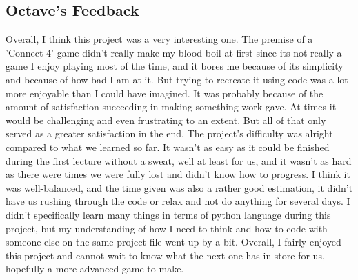 \documentclass{article}
\begin{document}
\subsection{Octave's Feedback}

Overall, I think this project was a very interesting one. The premise of a 'Connect 4' game didn't really make my blood boil at first since its not really a game I enjoy playing most of the time, and it bores me because of its simplicity and because of how bad I am at it. But trying to recreate it using code was a lot more enjoyable than I could have imagined. It was probably because of the amount of satisfaction succeeding in making something work gave. At times it would be challenging and even frustrating to an extent. But all of that only served as a greater satisfaction in the end. The project's difficulty was alright compared to what we learned so far. It wasn't as easy as it could be finished during the first lecture without a sweat, well at least for us, and it wasn't as hard as there were times we were fully lost and didn't know how to progress. I think it was well-balanced, and the time given was also a rather good estimation, it didn't have us rushing through the code or relax and not do anything for several days. I didn't specifically learn many things in terms of python language during this project, but my understanding of how I need to think and how to code with someone else on the same project file went up by a bit. Overall, I fairly enjoyed this project and cannot wait to know what the next one has in store for us, hopefully a more advanced game to make. 
\end{document}
